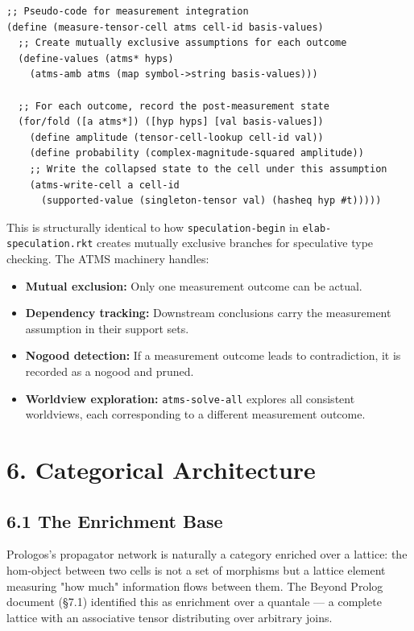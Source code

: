 \documentclass[11pt]{article}
\begin{document}
\begin{verbatim}
;; Pseudo-code for measurement integration
(define (measure-tensor-cell atms cell-id basis-values)
  ;; Create mutually exclusive assumptions for each outcome
  (define-values (atms* hyps)
    (atms-amb atms (map symbol->string basis-values)))

  ;; For each outcome, record the post-measurement state
  (for/fold ([a atms*]) ([hyp hyps] [val basis-values])
    (define amplitude (tensor-cell-lookup cell-id val))
    (define probability (complex-magnitude-squared amplitude))
    ;; Write the collapsed state to the cell under this assumption
    (atms-write-cell a cell-id
      (supported-value (singleton-tensor val) (hasheq hyp #t)))))
\end{verbatim}

This is structurally identical to how \texttt{speculation-begin} in \texttt{elab-speculation.rkt}
creates mutually exclusive branches for speculative type checking. The ATMS
machinery handles:
\begin{itemize}
\item \textbf{Mutual exclusion:} Only one measurement outcome can be actual.
\item \textbf{Dependency tracking:} Downstream conclusions carry the measurement assumption
in their support sets.
\item \textbf{Nogood detection:} If a measurement outcome leads to contradiction, it is
recorded as a nogood and pruned.
\item \textbf{Worldview exploration:} \texttt{atms-solve-all} explores all consistent worldviews,
each corresponding to a different measurement outcome.
\end{itemize}
\section{6. Categorical Architecture}
\label{sec:org44111c4}

\subsection{6.1 The Enrichment Base}
\label{sec:org09b68c5}

Prologos's propagator network is naturally a category enriched over a lattice: the
hom-object between two cells is not a set of morphisms but a lattice element
measuring "how much" information flows between them. The Beyond Prolog document
(§7.1) identified this as enrichment over a quantale --- a complete lattice with
an associative tensor distributing over arbitrary joins.
\end{document}
